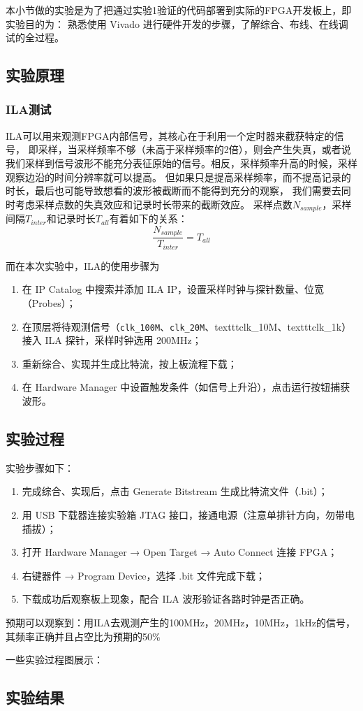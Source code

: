 
本小节做的实验是为了把通过实验1验证的代码部署到实际的FPGA开发板上，即实验目的为： 熟悉使用 Vivado 进行硬件开发的步骤，了解综合、布线、在线调试的全过程。





\subsection{实验原理}
\subsubsection{ILA测试}
ILA可以用来观测FPGA内部信号，其核心在于利用一个定时器来截获特定的信号，
即采样，当采样频率不够（未高于采样频率的2倍），则会产生失真，或者说我们采样到信号波形不能充分表征原始的信号。相反，采样频率升高的时候，采样观察边沿的时间分辨率就可以提高。
但如果只是提高采样频率，而不提高记录的时长，最后也可能导致想看的波形被截断而不能得到充分的观察，
我们需要去同时考虑采样点数的失真效应和记录时长带来的截断效应。
采样点数$ N_{sample} $，采样间隔$ T_{inter} $和记录时长$ T_{all} $有着如下的关系：
\[
\frac{N_{sample}}{T_{inter}} = T_{all}
\]

而在本次实验中，ILA的使用步骤为
\begin{enumerate}
    \item 在 IP Catalog 中搜索并添加 ILA IP，设置采样时钟与探针数量、位宽（Probes）；
    \item 在顶层将待观测信号（\texttt{clk\_100M}、\texttt{clk\_20M}、texttt{clk\_10M}、texttt{clk\_1k}）接入 ILA 探针，采样时钟选用 200MHz；
    \item 重新综合、实现并生成比特流，按上板流程下载；
    \item 在 Hardware Manager 中设置触发条件（如信号上升沿），点击运行按钮捕获波形。
\end{enumerate}


\subsection{实验过程}
实验步骤如下：
\begin{enumerate}
    \item 完成综合、实现后，点击 Generate Bitstream 生成比特流文件（.bit）；
    \item 用 USB 下载器连接实验箱 JTAG 接口，接通电源（注意单排针方向，勿带电插拔）；
    \item 打开 Hardware Manager → Open Target → Auto Connect 连接 FPGA；
    \item 右键器件 → Program Device，选择 .bit 文件完成下载；
    \item 下载成功后观察板上现象，配合 ILA 波形验证各路时钟是否正确。
\end{enumerate}

预期可以观察到：用ILA去观测产生的100MHz，20MHz，10MHz，1kHz的信号，其频率正确并且占空比为预期的50\%


一些实验过程图展示：



\subsection{实验结果}
